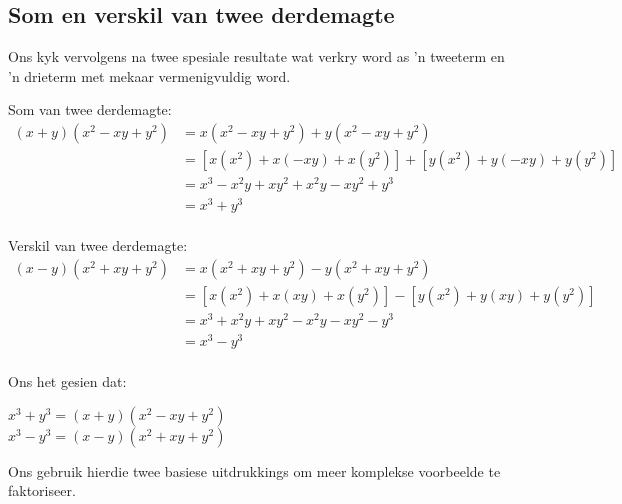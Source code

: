 \subsection*{Som en verskil van twee derdemagte}      
Ons kyk vervolgens na twee spesiale resultate wat verkry word as 'n tweeterm en 'n drieterm met mekaar vermenigvuldig word.\par

Som van twee derdemagte:
\begin{align*}
  (x+y)({x}^{2}-xy+{y}^{2}) &= x({x}^{2}-xy+{y}^{2})+y({x}^{2}- xy+{y}^{2})\\
  &= \left[x({x}^{2})+x(-xy)+x({y}^{2})\right]+\left[y({x}^{2})+y(-xy)+y({y}^{2})\right]\\
  &= {x}^{3}-{x}^{2}y+x{y}^{2}+{x}^{2}y-x{y}^{2}+{y}^{3} \\
  &= {x}^{3}+{y}^{3}\\
\end{align*}

\par
Verskil van twee derdemagte:
\begin{align*}
(x-y)({x}^{2}+xy+{y}^{2}) &= x({x}^{2}+xy+{y}^{2})-y({x}^{2}+ xy+{y}^{2})\\
  &= \left[x({x}^{2})+x(xy)+x({y}^{2})\right]-\left[y({x}^{2})+y(xy)+y({y}^{2})\right]\\
  &= {x}^{3}+{x}^{2}y+x{y}^{2}-{x}^{2}y-x{y}^{2}-{y}^{3} \\
  &= {x}^{3}-{y}^{3}\\
\end{align*}

Ons het gesien dat:
\begin{center}
${x}^{3}+{y}^{3}=(x+y)({x}^{2}-xy+{y}^{2})$\\
${x}^{3}-{y}^{3}=(x-y)({x}^{2}+xy+{y}^{2})$\\
\end{center}
\par
Ons gebruik hierdie twee basiese uitdrukkings om meer komplekse voorbeelde te faktoriseer.


